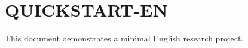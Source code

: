 \documentclass{abntexto-ufc}
\begin{document}
\section{QUICKSTART-EN}
This document demonstrates a minimal English research project.
\end{document}
